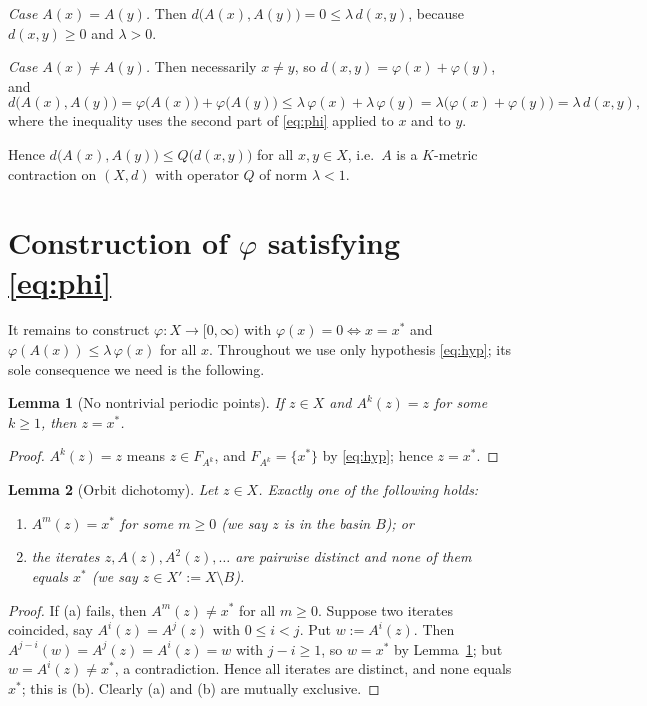 \documentclass{amsart}
\newtheorem{lemma}{Lemma}
\theoremstyle{definition}
\begin{document}
\emph{Case $A(x)=A(y)$.} Then $d\bigl(A(x),A(y)\bigr)=0\le\lambda\,d(x,y)$,
because $d(x,y)\ge 0$ and $\lambda>0$.

\emph{Case $A(x)\ne A(y)$.} Then necessarily $x\ne y$, so
$d(x,y)=\varphi(x)+\varphi(y)$, and
\[
  d\bigl(A(x),A(y)\bigr)=\varphi\bigl(A(x)\bigr)+\varphi\bigl(A(y)\bigr)
  \le\lambda\,\varphi(x)+\lambda\,\varphi(y)
  =\lambda\bigl(\varphi(x)+\varphi(y)\bigr)=\lambda\,d(x,y),
\]
where the inequality uses the second part of \eqref{eq:phi} applied to $x$ and to
$y$.

Hence $d\bigl(A(x),A(y)\bigr)\le Q\bigl(d(x,y)\bigr)$ for all $x,y\in X$, i.e.\ $A$
is a $K$-metric contraction on $(X,d)$ with operator $Q$ of norm $\lambda<1$.

\section{Construction of $\varphi$ satisfying \eqref{eq:phi}}

It remains to construct $\varphi:X\to[0,\infty)$ with $\varphi(x)=0\iff x=x^*$ and
$\varphi(A(x))\le\lambda\,\varphi(x)$ for all $x$. Throughout we use only
hypothesis \eqref{eq:hyp}; its sole consequence we need is the following.

\begin{lemma}[No nontrivial periodic points]\label{lem:nocycle}
If $z\in X$ and $A^k(z)=z$ for some $k\ge 1$, then $z=x^*$.
\end{lemma}
\begin{proof}
$A^k(z)=z$ means $z\in F_{A^k}$, and $F_{A^k}=\{x^*\}$ by \eqref{eq:hyp}; hence
$z=x^*$.
\end{proof}

\begin{lemma}[Orbit dichotomy]\label{lem:dich}
Let $z\in X$. Exactly one of the following holds:
\begin{enumerate}
\item[\rm(a)] $A^m(z)=x^*$ for some $m\ge 0$ (we say $z$ is in the \emph{basin}
$B$); or
\item[\rm(b)] the iterates $z,A(z),A^2(z),\dots$ are pairwise distinct and none of
them equals $x^*$ (we say $z\in X':=X\setminus B$).
\end{enumerate}
\end{lemma}
\begin{proof}
If (a) fails, then $A^m(z)\ne x^*$ for all $m\ge 0$. Suppose two iterates
coincided, say $A^i(z)=A^j(z)$ with $0\le i<j$. Put $w:=A^i(z)$. Then
$A^{j-i}(w)=A^{j}(z)=A^i(z)=w$ with $j-i\ge 1$, so $w=x^*$ by
Lemma~\ref{lem:nocycle}; but $w=A^i(z)\ne x^*$, a contradiction. Hence all
iterates are distinct, and none equals $x^*$; this is (b). Clearly (a) and (b) are
mutually exclusive.
\end{proof}
\end{document}
